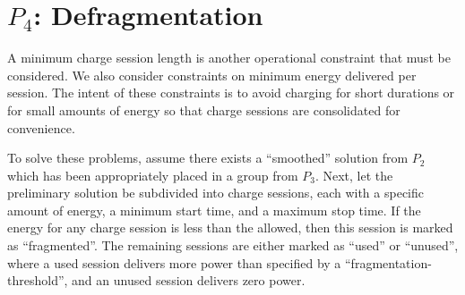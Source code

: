 \section{$P_4$: Defragmentation\label{sec:defragmentation}}

A minimum charge session length is another operational constraint that must be considered. We also consider constraints on minimum energy delivered per session. The intent of these constraints is to avoid charging for short durations or for small amounts of energy so that charge sessions are consolidated for convenience. 

\par To solve these problems, assume there exists a ``smoothed'' solution from $P_2$ which has been appropriately placed in a group from $P_3$. Next, let the preliminary solution be subdivided into charge sessions, each with a specific amount of energy, a minimum start time, and a maximum stop time. If the energy for any charge session is less than the allowed, then this session is marked as ``fragmented''.  The remaining sessions are either marked as ``used'' or ``unused'', where a used session delivers more power than specified by a ``fragmentation-threshold'', and an unused session delivers zero power. 

